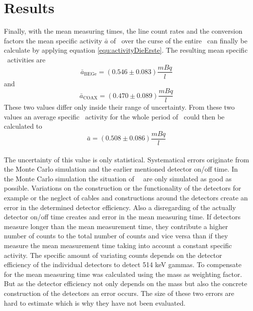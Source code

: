 \documentclass[encoding=utf8,british]{tumphthesis}
\begin{document}
\section{Results}
\label{sec:res}
Finally, with the mean measuring times, the line count rates and the conversion factors the mean specific activity $\bar{a}$ of \Kr\ over the curse of the entire \PII\ can  finally be calculate by applying equation \ref{equ:activityDieErste}.
The resulting mean specific \Kr\ activities are
\begin{equation*}
    \bar{a}_{\mathrm{BEGe}} = (0.546\pm0.083)	\frac{\unit{mBq}}{\unit{l}}
\end{equation*}
and
\begin{equation*}
    \bar{a}_{\mathrm{COAX}} = (0.470\pm0.089)	\frac{\unit{mBq}}{\unit{l}}
\end{equation*}
These two values differ only inside their range of uncertainty.
From these two values an average specific \Kr\ activity for the whole period of \PII\ could then be calculated to
\begin{equation*}
\bar{a} = (0.508\pm0.086)\frac{\unit{mBq}}{\unit{l}}
\end{equation*}
\\

The uncertainty of this value is only statistical.
Systematical errors originate from the Monte Carlo simulation and the earlier mentioned detector on/off time. 
In the Monte Carlo simulation the situation of \gerda\ \PII\ are only simulated as good as possible.
Variations on the construction or the functionality of the detectors for example or the neglect of cables and constructions around the detectors create an error in the determined detector efficiency.
Also a disregarding of the actually detector on/off time creates and error in the mean measuring time.
If detectors measure longer than the mean measurement time, they contribute a higher number of counts to the total number of counts and vice versa than if they measure the mean measurement time taking into account a constant specific activity.
The specific amount of variating counts depends on the detector efficiency of the individual detectors to detect 514 keV gammas.
To compensate for the mean measuring time was calculated using the mass as weighting factor.
But as the detector efficiency not only depends on the mass but also the concrete construction of the detectors an error occurs.
The size of these two errors are hard to estimate which is why they have not been evaluated.

\end{document}
